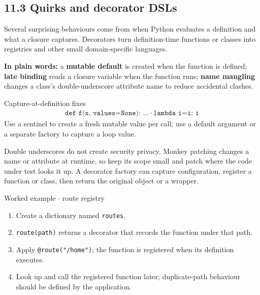 \documentclass[11pt]{article}
\begin{document}
\begin{keepsection}
\section{11.3 Quirks and decorator DSLs}

Several surprising behaviours come from when Python evaluates a definition and what a closure captures. Decorators turn definition-time functions or classes into registries and other small domain-specific languages.

\begin{plainbox}\textbf{In plain words:} a \textbf{mutable default} is created when the function is defined; \textbf{late binding} reads a closure variable when the function runs; \textbf{name mangling} changes a class’s double-underscore attribute name to reduce accidental clashes.\end{plainbox}

\begin{equationcard}{Capture-at-definition fixes}
\[ \begin{gathered} \texttt{def f(x, values=None): …}\, \cdot \, \texttt{lambda i=i: i} \end{gathered} \]
{\small Use a sentinel to create a fresh mutable value per call; use a default argument or a separate factory to capture a loop value.}
\end{equationcard}

Double underscores do not create security privacy. Monkey patching changes a name or attribute at runtime, so keep its scope small and patch where the code under test looks it up. A decorator factory can capture configuration, register a function or class, then return the original object or a wrapper.

\begin{workedbox}{Worked example \ensuremath{\cdot} route registry}
\begin{enumerate}
\item Create a dictionary named \texttt{routes}.
\item \texttt{route(path)} returns a decorator that records the function under that path.
\item Apply \texttt{@route("/home")}; the function is registered when its definition executes.
\item Look up and call the registered function later; duplicate-path behaviour should be defined by the application.
\end{enumerate}
\end{workedbox}


\end{keepsection}
\end{document}

